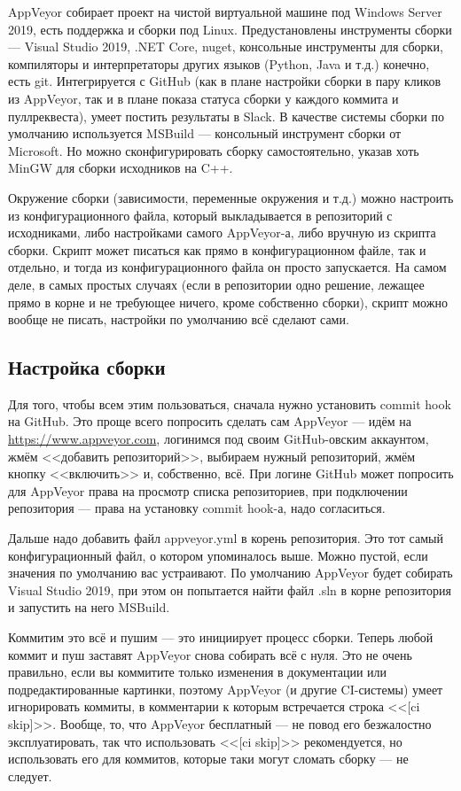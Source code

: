 \documentclass[a5paper]{article}
\begin{document}
AppVeyor собирает проект на чистой виртуальной машине под Windows Server 2019, есть поддержка и сборки под Linux. Предустановлены инструменты сборки --- Visual Studio 2019, .NET Core, nuget, консольные инструменты для сборки, компиляторы и интерпретаторы других языков (Python, Java и т.д.) конечно, есть git. Интегрируется с GitHub (как в плане настройки сборки в пару кликов из AppVeyor, так и в плане показа статуса сборки у каждого коммита и пуллреквеста), умеет постить результаты в Slack. В качестве системы сборки по умолчанию используется MSBuild --- консольный инструмент сборки от Microsoft. Но можно сконфигурировать сборку самостоятельно, указав хоть MinGW для сборки исходников на C++.

Окружение сборки (зависимости, переменные окружения и т.д.) можно настроить из конфигурационного файла, который выкладывается в репозиторий с исходниками, либо настройками самого AppVeyor-а, либо вручную из скрипта сборки. Скрипт может писаться как прямо в конфигурационном файле, так и отдельно, и тогда из конфигурационного файла он просто запускается. На самом деле, в самых простых случаях (если в репозитории одно решение, лежащее прямо в корне и не требующее ничего, кроме собственно сборки), скрипт можно вообще не писать, настройки по умолчанию всё сделают сами.

\subsection{Настройка сборки}

Для того, чтобы всем этим пользоваться, сначала нужно установить commit hook на GitHub. Это проще всего попросить сделать сам AppVeyor --- идём на \url{https://www.appveyor.com}, логинимся под своим GitHub-овским аккаунтом, жмём <<добавить репозиторий>>, выбираем нужный репозиторий, жмём кнопку <<включить>> и, собственно, всё. При логине GitHub может попросить для AppVeyor права на просмотр списка репозиториев, при подключении репозитория --- права на установку commit hook-а, надо согласиться.

Дальше надо добавить файл appveyor.yml в корень репозитория. Это тот самый конфигурационный файл, о котором упоминалось выше. Можно пустой, если значения по умолчанию вас устраивают. По умолчанию AppVeyor будет собирать Visual Studio 2019, при этом он попытается найти файл .sln в корне репозитория и запустить на него MSBuild.

Коммитим это всё и пушим --- это инициирует процесс сборки. Теперь любой коммит и пуш заставят AppVeyor снова собирать всё с нуля. Это не очень правильно, если вы коммитите только изменения в документации или подредактированные картинки, поэтому AppVeyor (и другие CI-системы) умеет игнорировать коммиты, в комментарии к которым встречается строка <<[ci skip]>>. Вообще, то, что AppVeyor бесплатный --- не повод его безжалостно эксплуатировать, так что использовать <<[ci skip]>> рекомендуется, но использовать его для коммитов, которые таки могут сломать сборку --- не следует.
\end{document}
